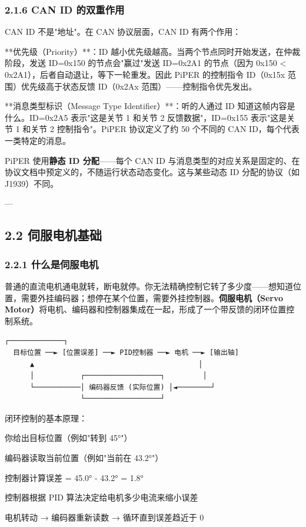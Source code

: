 \documentclass[UTF8,a4paper,11pt]{ctexart}
\begin{document}
\subsubsection{2.1.6 CAN ID 的双重作用}

CAN ID 不是"地址"。在 CAN 协议层面，CAN ID 有两个作用：

\item[1] **优先级（Priority）**：ID 越小优先级越高。当两个节点同时开始发送，在仲裁阶段，发送 ID=0x150 的节点会"赢过"发送 ID=0x2A1 的节点（因为 0x150 < 0x2A1），后者自动退让，等下一轮重发。因此 PiPER 的控制指令 ID（0x15x 范围）优先级高于状态反馈 ID（0x2Ax 范围）——控制指令优先发出。

\item[2] **消息类型标识（Message Type Identifier）**：听的人通过 ID 知道这帧内容是什么。ID=0x2A5 表示"这是关节 1 和关节 2 反馈数据"，ID=0x155 表示"这是关节 1 和关节 2 控制指令"。PiPER 协议定义了约 50 个不同的 CAN ID，每个代表一类特定的消息。

PiPER 使用\textbf{静态 ID 分配}——每个 CAN ID 与消息类型的对应关系是固定的、在协议文档中预定义的，不随运行状态动态变化。这与某些动态 ID 分配的协议（如 J1939）不同。

---

\subsection{2.2 伺服电机基础}

\subsubsection{2.2.1 什么是伺服电机}

普通的直流电机通电就转，断电就停。你无法精确控制它转了多少度——想知道位置，需要外挂编码器；想停在某个位置，需要外挂控制器。\textbf{伺服电机（Servo Motor）}将电机、编码器和控制器集成在一起，形成了一个带反馈的闭环位置控制系统。

\begin{lstlisting}[language=text]
                          ┌─────────────┐
  目标位置 ──► [位置误差] ──► PID控制器 ──► 电机 ──► [输出轴]
      ▲                                       │
      │           ┌──────────────────┐         │
      └───────────│ 编码器反馈 (实际位置) │◄────────┘
                  └──────────────────┘
\end{lstlisting}

闭环控制的基本原理：
\item[1] 你给出目标位置（例如"转到 45°"）
\item[2] 编码器读取当前位置（例如"当前在 43.2°"）
\item[3] 控制器计算误差 = 45.0° - 43.2° = 1.8°
\item[4] 控制器根据 PID 算法决定给电机多少电流来缩小误差
\item[5] 电机转动 → 编码器重新读数 → 循环直到误差趋近于 0
\end{document}
